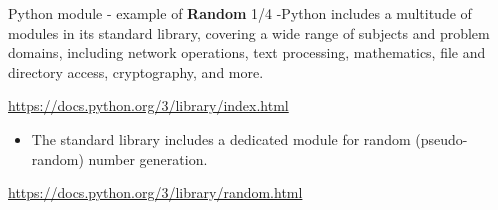 \documentclass[
  8pt,
  ignorenonframetext,
]{beamer}
\providecommand{\tightlist}{%
  \setlength{\itemsep}{0pt}\setlength{\parskip}{0pt}}
\begin{document}
\begin{frame}{Python module - example of \textbf{Random} 1/4}
\protect\hypertarget{python-module---example-of-random-14}{}
-Python includes a multitude of modules in its standard library,
covering a wide range of subjects and problem domains, including network
operations, text processing, mathematics, file and directory access,
cryptography, and more.

\url{https://docs.python.org/3/library/index.html}

\begin{itemize}
\tightlist
\item
  The standard library includes a dedicated module for random
  (pseudo-random) number generation.
\end{itemize}

\url{https://docs.python.org/3/library/random.html}
\end{frame}
\end{document}
